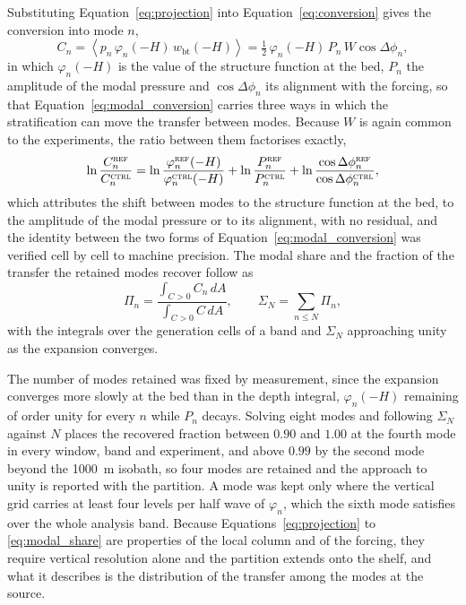 \documentclass[a4paper,fleqn]{cas-sc}
\newcommand{\bt}{\mathrm{bt}}
\newcommand{\REF}{\textsc{ref}}
\newcommand{\CTRL}{\textsc{ctrl}}
\begin{document}
Substituting Equation~\ref{eq:projection} into Equation~\ref{eq:conversion} gives the conversion \citep{bendinger_2023, kurapov:2003} into mode $n$,
\begin{equation}
C_{n}=\left\langle p_{n}\,\varphi_{n}(-H)\,w_{\bt}(-H)\right\rangle
=\tfrac{1}{2}\,\varphi_{n}(-H)\,P_{n}\,W\cos\Delta\phi_{n} ,
\label{eq:modal_conversion}
\end{equation}
in which $\varphi_{n}(-H)$ is the value of the structure function at the bed, $P_{n}$ the amplitude of the modal pressure and $\cos\Delta\phi_{n}$ its alignment with the forcing, so that Equation~\ref{eq:modal_conversion} carries three ways in which the stratification can move the transfer between modes. Because $W$ is again common to the experiments, the ratio between them factorises exactly,
\begin{equation}
\ln\frac{C_{n}^{\REF}}{C_{n}^{\CTRL}}
=\ln\frac{\varphi_{n}^{\REF}(-H)}{\varphi_{n}^{\CTRL}(-H)}
+\ln\frac{P_{n}^{\REF}}{P_{n}^{\CTRL}}
+\ln\frac{\cos\Delta\phi_{n}^{\REF}}{\cos\Delta\phi_{n}^{\CTRL}} ,
\label{eq:modal_factorise}
\end{equation}
which attributes the shift between modes to the structure function at the bed, to the amplitude of the modal pressure or to its alignment, with no residual, and the identity between the two forms of Equation~\ref{eq:modal_conversion} was verified cell by cell to machine precision. The modal share and the fraction of the transfer the retained modes recover follow as
\begin{equation}
\Pi_{n}=\frac{\displaystyle\int_{C>0}C_{n}\,dA}{\displaystyle\int_{C>0}C\,dA} ,
\qquad
\Sigma_{N}=\sum_{n\leq N}\Pi_{n} ,
\label{eq:modal_share}
\end{equation}
with the integrals over the generation cells of a band and $\Sigma_{N}$ approaching unity as the expansion converges.

The number of modes retained was fixed by measurement, since the expansion converges more slowly at the bed than in the depth integral, $\varphi_{n}(-H)$ remaining of order unity for every $n$ while $P_{n}$ decays. Solving eight modes and following $\Sigma_{N}$ against $N$ places the recovered fraction between $0.90$ and $1.00$ at the fourth mode in every window, band and experiment, and above $0.99$ by the second mode beyond the 1000~m isobath, so four modes are retained and the approach to unity is reported with the partition. A mode was kept only where the vertical grid carries at least four levels per half wave of $\varphi_{n}$, which the sixth mode satisfies over the whole analysis band. Because Equations~\ref{eq:projection} to \ref{eq:modal_share} are properties of the local column and of the forcing, they require vertical resolution alone and the partition extends onto the shelf, and what it describes is the distribution of the transfer among the modes at the source.
\end{document}
